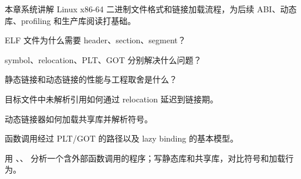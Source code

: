 {本章系统讲解 Linux x86-64 二进制文件格式和链接加载流程，为后续 ABI、动态库、profiling 和生产库阅读打基础。}
{\item ELF 文件为什么需要 header、section、segment？
\item symbol、relocation、PLT、GOT 分别解决什么问题？
\item 静态链接和动态链接的性能与工程取舍是什么？}
{\item 目标文件中未解析引用如何通过 relocation 延迟到链接期。
\item 动态链接器如何加载共享库并解析符号。
\item 函数调用经过 PLT/GOT 的路径以及 lazy binding 的基本模型。}
{用 、、 分析一个含外部函数调用的程序；写静态库和共享库，对比符号和加载行为。}

